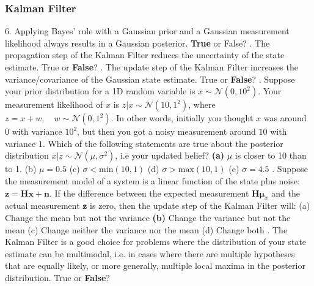 \documentclass[a4paper,10pt]{article}
\begin{document}
\subsubsection*{Kalman Filter}
6. Applying Bayes' rule with a Gaussian prior and a Gaussian measurement likelihood always results in a Gaussian posterior. \textbf{True} or False?
\newline
{}. The propagation step of the Kalman Filter reduces the uncertainty of the state estimate. True or \textbf{False}?
\newline
{}. The update step of the Kalman Filter increases the variance/covariance of the Gaussian state estimate. True or \textbf{False}?
\newline
{}. Suppose your prior distribution for a 1D random variable is $x\sim \mathcal{N}(0,10^2)$. Your measurement likelihood of $x$ is $z|x \sim \mathcal{N}(10, 1^2)$, where $z=x+w, \quad w\sim\mathcal{N}(0,1^2)$.
In other words, initially you thought $x$ was around $0$ with variance $10^2$, but then you got a noisy measurement around $10$ with variance $1$. Which of the following statements are true about the posterior 
distribution $x|z\sim\mathcal{N}(\mu, \sigma^2)$, i.e your updated belief?
\newline
\newline
\textbf{(a)} $\mu$ is closer to 10 than to 1.
\newline
(b) $\mu=0.5$
\newline
(c) $\sigma < \text{min}(10, 1)$
\newline
(d) $\sigma > \text{max}(10, 1)$
\newline
(e) $\sigma = 4.5$
\newline
{}. Suppose the measurement model of a system is a linear function of the state plus noise: $\textbf{z}=\textbf{H}\textbf{x} + \textbf{n}$. 
If the difference between the expected measurement $\textbf{H}\boldsymbol{\mu}_x$ and the actual measurement $\bar{\textbf{z}}$ is zero, then 
the update step of the Kalman Filter will:
\newline
(a) Change the mean but not the variance
\newline
\textbf{(b)} Change the variance but not the mean
\newline
(c) Change neither the variance nor the mean
\newline
(d) Change both
\newline
{}. The Kalman Filter is a good choice for problems where the distribution of your state estimate can be multimodal, i.e. in cases where there are multiple hypotheses
that are equally likely, or more generally, multiple local maxima in the posterior distribution. True or \textbf{False}?
\end{document}
